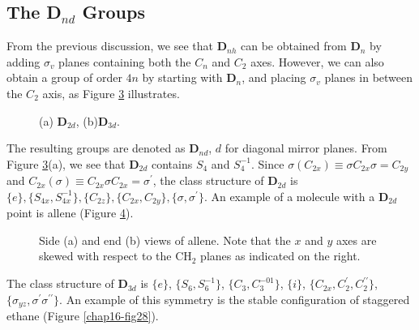 \begin{figure}
\caption{}
\label{chap16-fig24}
\end{figure}

\begin{figure}
\caption{}
\label{chap16-fig25}
\end{figure}

\subsection{The D$_{nd}$ Groups}

From the previous discussion, we see that {\bf D}$_{nh}$ can be
obtained from {\bf D}$_n$ by adding $\sigma_v$ planes containing both
the $C_n$ and $C_2$ axes.  However, we can also obtain a group of
order $4n$ by starting with {\bf D}$_n$, and placing $\sigma_v$ planes
in between the $C_2$ axis, as Figure \ref{chap16-fig26} illustrates.

\begin{figure}
\caption{(a) {\bf D}$_{2d}$, (b){\bf D}$_{3d}$.}
\label{chap16-fig26}
\end{figure}

The resulting groups are denoted as {\bf D}$_{nd}$, $d$ for diagonal
mirror planes. From Figure \ref{chap16-fig26}(a), we see that {\bf
D}$_{2d}$ contains $S_4$ and $S_4^{-1}$. Since $\sigma (C_{2x}) \equiv
\sigma C_{2x}\sigma = C_{2y}$ and $C_{2x}(\sigma) \equiv C_{2x} \sigma
C_{2x} = \sigma^{\prime}$, the class structure of {\bf D}$_{2d}$ is
$\{e\}, \{S_{4x} , S_{4x}^{-1}\} , \{C_{2z} \} , \{C_{2x} , C_{2y} \}
, \{ \sigma , \sigma^{\prime} \}$.  An example of a molecule with a
{\bf D}$_{2d}$ point is allene (Figure \ref{chap16-fig27}).

\begin{figure}
\caption{Side (a) and end (b) views of allene. Note that the $x$ and
$y$ axes are skewed with respect to the CH$_2$ planes as indicated
on the right.}
\label{chap16-fig27}
\end{figure}


The class structure of {\bf D}$_{3d}$ is $\{ e\}$, $\{ S_6 , S_6^{-1} 
\}$, $\{ C_3 , C_3^{-01} \}$, $\{ i \}$, $\{ C_{2x} , C_2^{\prime} , 
C_2^{\prime \prime} \}$, $\{ \sigma_{yz} , \sigma^{\prime} 
\sigma^{\prime \prime} \}$.  An example of this symmetry is the stable 
configuration of staggered ethane (Figure \ref{chap16-fig28}).

